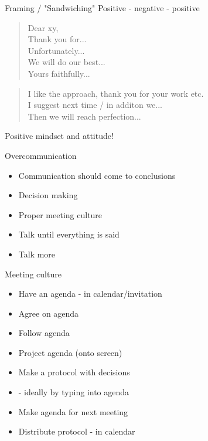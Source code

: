 \begin{frame}{Framing / "Sandwiching"}
    Positive - negative - positive
    
    \medskip
    
    \begin{quote}
        Dear xy,\\
        Thank you for... \\
        Unfortunately...\\
        We will do our best...\\
        Yours faithfully...
    \end{quote}
    
    \medskip

    \begin{quote}
        I like the approach, thank you for your work etc.\\
        I suggest next time / in additon we...\\
        Then we will reach perfection...\\
    \end{quote}

    Positive mindset and attitude! 

\end{frame}


\begin{frame}{Overcommunication}
    \begin{itemize}
        \item Communication should come to conclusions
        \item Decision making
        \item Proper meeting culture
        \item Talk until everything is said
        \item Talk more
    \end{itemize}
\end{frame}

\begin{frame}{Meeting culture}
    \begin{itemize}
        \item Have an agenda - in calendar/invitation
        \item Agree on agenda
        \item Follow agenda
        \item Project agenda (onto screen)
        \item Make a protocol with decisions
        \item[] - ideally by typing into agenda
        \item Make agenda for next meeting
        \item Distribute protocol - in calendar        
    \end{itemize}
\end{frame}
